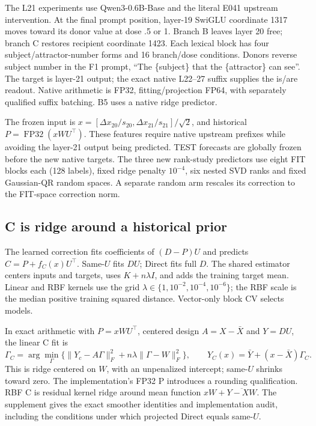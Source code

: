 \documentclass[11pt]{article}
\begin{document}
The L21 experiments use Qwen3-0.6B-Base and the literal E041 upstream intervention. At the final prompt position, layer-19 SwiGLU coordinate 1317 moves toward its donor value at dose .5 or 1. Branch B leaves layer 20 free; branch C restores recipient coordinate 1423. Each lexical block has four subject/attractor-number forms and 16 branch/dose conditions. Donors reverse subject number in the F1 prompt, ``The \{subject\} that the \{attractor\} can see''. The target is layer-21 output; the exact native L22--27 suffix supplies the is/are readout. Native arithmetic is FP32, fitting/projection FP64, with separately qualified suffix batching. B5 uses a native ridge predictor.

The frozen input is $x=[\Delta x_{20}/s_{20},\Delta x_{21}/s_{21}]/\sqrt2$, and historical $P=\operatorname{FP32}(xWU^\top)$. These features require native upstream prefixes while avoiding the layer-21 output being predicted. TEST forecasts are globally frozen before the new native targets. The three new rank-study predictors use eight FIT blocks each (128 labels), fixed ridge penalty $10^{-4}$, six nested SVD ranks and fixed Gaussian-QR random spaces. A separate random arm rescales its correction to the FIT-space correction norm.

\subsection{C is ridge around a historical prior}
The learned correction fits coefficients of $(D-P)U$ and predicts $C=P+f_C(x)U^\top$. Same-$U$ fits $DU$; Direct fits full $D$. The shared estimator centers inputs and targets, uses $K+n\lambda I$, and adds the training target mean. Linear and RBF kernels use the grid $\lambda\in\{1,10^{-2},10^{-4},10^{-6}\}$; the RBF scale is the median positive training squared distance. Vector-only block CV selects models.

In exact arithmetic with $P=xWU^\top$, centered design $A=X-\bar X$ and $Y=DU$, the linear C fit is
\[
 \Gamma_C=\arg\min_\Gamma\big\{\|Y_c-A\Gamma\|_F^2+n\lambda\|\Gamma-W\|_F^2\big\},
 \qquad \widehat Y_C(x)=\bar Y+(x-\bar X)\Gamma_C.
\]
This is ridge centered on $W$, with an unpenalized intercept; same-$U$ shrinks toward zero. The implementation's FP32 P introduces a rounding qualification. RBF C is residual kernel ridge around mean function $xW+\overline{Y-XW}$. The supplement gives the exact smoother identities and implementation audit, including the conditions under which projected Direct equals same-$U$.
\end{document}
